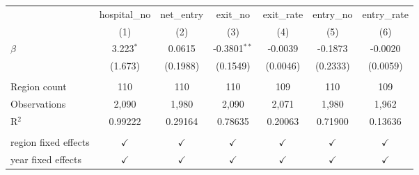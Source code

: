 \begingroup
\centering
\begin{tabular}{lcccccc}
   \toprule
                        & hospital\_no  & net\_entry    & exit\_no       & exit\_rate    & entry\_no     & entry\_rate\\   
                        & (1)           & (2)           & (3)            & (4)           & (5)           & (6)\\  
   \midrule 
   $\beta$              & 3.223$^{*}$   & 0.0615        & -0.3801$^{**}$ & -0.0039       & -0.1873       & -0.0020\\   
                        & (1.673)       & (0.1988)      & (0.1549)       & (0.0046)      & (0.2333)      & (0.0059)\\   
    \\
   Region count         & 110           & 110           & 110           & 109           & 110           & 109\\
   Observations         & 2,090         & 1,980         & 2,090          & 2,071         & 1,980         & 1,962\\  
   R$^2$                & 0.99222       & 0.29164       & 0.78635        & 0.20063       & 0.71900       & 0.13636\\  
    \\
   region fixed effects & $\checkmark$  & $\checkmark$  & $\checkmark$   & $\checkmark$  & $\checkmark$  & $\checkmark$\\   
   year fixed effects   & $\checkmark$  & $\checkmark$  & $\checkmark$   & $\checkmark$  & $\checkmark$  & $\checkmark$\\   
   \bottomrule
\end{tabular}
\par\endgroup
